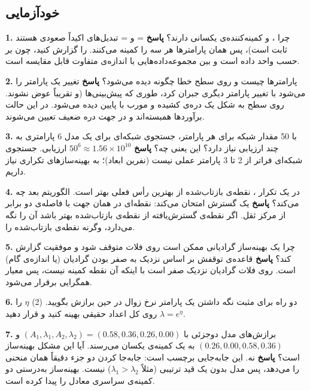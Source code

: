 \subsection{خودآزمایی}

\textbf{1.} چرا ،  و  کمینه‌کننده‌ی یکسانی دارند؟
\textbf{پاسخ}  =  و  =  تبدیل‌های
اکیداً صعودی  هستند  ثابت است)، پس همان پارامترها هر سه را
کمینه می‌کنند.  را گزارش کنید، چون بر حسب واحد داده است و بین
مجموعه‌داده‌هایی با اندازه‌ی متفاوت قابل مقایسه است.

\textbf{2.}  پارامترها چیست و روی سطح خطا چگونه دیده
می‌شود؟ \textbf{پاسخ} تغییر یک پارامتر را می‌شود با تغییر پارامتر دیگری
جبران کرد، طوری که پیش‌بینی‌ها (و  تقریباً عوض نشوند. روی سطح به
شکل یک دره‌ی کشیده و مورب با  پایین دیده می‌شود. در این حالت
برآوردها همبسته‌اند و در جهت دره ضعیف تعیین می‌شوند.

\textbf{3.} با 50 مقدار شبکه برای هر پارامتر، جستجوی شبکه‌ای برای یک مدل
6 پارامتری به چند ارزیابی  نیاز دارد؟ این یعنی چه؟ \textbf{پاسخ}
\(50^6 \approx 1.56 \times 10^{10}\) ارزیابی. جستجوی شبکه‌ای فراتر از 2
تا 3 پارامتر عملی نیست (نفرین ابعاد)؛ به بهینه‌سازهای تکراری نیاز داریم.

\textbf{4.} در یک تکرار ، نقطه‌ی بازتاب‌شده از بهترین رأس
فعلی بهتر است. الگوریتم بعد چه می‌کند؟ \textbf{پاسخ} یک گسترش امتحان
می‌کند: نقطه‌ای در همان جهت با فاصله‌ی دو برابر از مرکز ثقل. اگر نقطه‌ی
گسترش‌یافته از نقطه‌ی بازتاب‌شده بهتر باشد آن را نگه می‌دارد، وگرنه نقطه‌ی
بازتاب‌شده را.

\textbf{5.} چرا یک بهینه‌ساز گرادیانی ممکن است روی فلات متوقف شود و
موفقیت گزارش کند؟ \textbf{پاسخ} قاعده‌ی توقفش بر اساس نزدیک به صفر بودن
گرادیان (یا اندازه‌ی گام) است. روی فلات گرادیان نزدیک صفر است با اینکه آن
نقطه کمینه نیست، پس معیار همگرایی برقرار می‌شود.

\textbf{6.} دو راه برای مثبت نگه داشتن یک پارامتر نرخ زوال در حین برازش
بگویید. (2)  \(\eta\) را روی کل اعداد حقیقی
بهینه کنید و قرار دهید \(\lambda = e^{\eta}\).

\textbf{7.} برازش‌های  مدل دوجزئی با
\((A_1,\allowbreak \lambda_1,\allowbreak A_2,\allowbreak \lambda_2) = (0.58,\allowbreak 0.36,\allowbreak 0.26,\allowbreak 0.00)\) و
\((0.26, 0.00, 0.58, 0.36)\) به یک  کمینه‌ی یکسان می‌رسند. آیا این
مشکل بهینه‌ساز است؟ \textbf{پاسخ} نه. این جابه‌جایی برچسب  است: جابه‌جا کردن دو جزء دقیقاً همان منحنی را می‌دهد، پس مدل
بدون یک قید ترتیبی (مثلاً \(\lambda_1 > \lambda_2\)) 
نیست. بهینه‌ساز به‌درستی دو کمینه‌ی سراسری معادل را پیدا کرده است.

